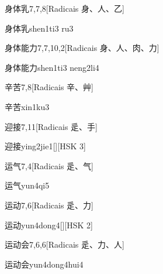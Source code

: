 \begin{entry}{身体乳}{7,7,8}[Radicais ⾝、⼈、⼄]
  \begin{phonetics}{身体乳}{shen1ti3 ru3}
  \end{phonetics}
\end{entry}

\begin{entry}{身体能力}{7,7,10,2}[Radicais ⾝、⼈、⾁、⼒]
  \begin{phonetics}{身体能力}{shen1ti3 neng2li4}
  \end{phonetics}
\end{entry}

\begin{entry}{辛苦}{7,8}[Radicais ⾟、⾋]
  \begin{phonetics}{辛苦}{xin1ku3}
  \end{phonetics}
\end{entry}

\begin{entry}{迎接}{7,11}[Radicais ⾡、⼿]
  \begin{phonetics}{迎接}{ying2jie1}[][HSK 3]
  \end{phonetics}
\end{entry}

\begin{entry}{运气}{7,4}[Radicais ⾡、⽓]
  \begin{phonetics}{运气}{yun4qi5}
  \end{phonetics}
\end{entry}

\begin{entry}{运动}{7,6}[Radicais ⾡、⼒]
  \begin{phonetics}{运动}{yun4dong4}[][HSK 2]
  \end{phonetics}
\end{entry}

\begin{entry}{运动会}{7,6,6}[Radicais ⾡、⼒、⼈]
  \begin{phonetics}{运动会}{yun4dong4hui4}
  \end{phonetics}
\end{entry}

